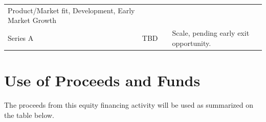 \documentclass[10pt,openany]{book}
\begin{document}
\begin{longtable}[]{@{}lrcl@{}}
\begin{minipage}[t]{0.55\columnwidth}
Product/Market fit, Development, Early Market Growth\strut
\end{minipage}\tabularnewline
\begin{minipage}[t]{0.13\columnwidth}\raggedright
Series A\strut
\end{minipage} & \begin{minipage}[t]{0.10\columnwidth}\raggedleft
TBD\strut
\end{minipage} & \begin{minipage}[t]{0.10\columnwidth}\centering
\strut
\end{minipage} & \begin{minipage}[t]{0.55\columnwidth}\raggedright
Scale, pending early exit opportunity.\strut
\end{minipage}\tabularnewline
\bottomrule
\end{longtable}

\newpage

\hypertarget{use-of-proceeds-and-funds}{%
\section{Use of Proceeds and Funds}\label{use-of-proceeds-and-funds}}

The proceeds from this equity financing activity will be used as
summarized on the table below.
\end{document}
